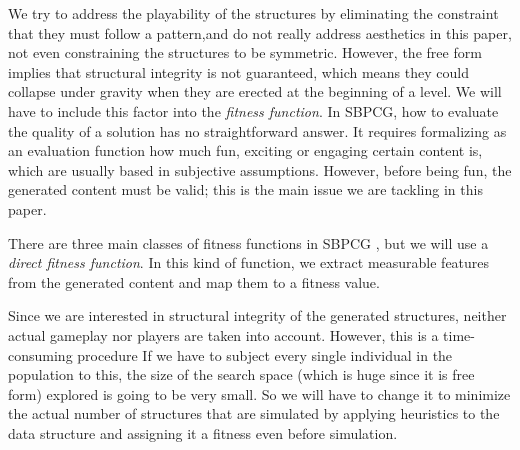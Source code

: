 \documentclass[runningheads,a4paper]{llncs}
\begin{document}
We try to address the playability of the structures by eliminating the constraint
that they must follow a pattern,and do not really address aesthetics
in this paper, not even constraining the structures to be
symmetric. However, the free form implies that structural integrity is
not guaranteed, which means they could collapse under gravity 
when they are erected at the
beginning of a level. We will have to include this factor into the 
\textit{fitness function}.
In SBPCG, how to evaluate the quality of a solution has no straightforward 
answer. It requires formalizing as an evaluation function how much fun, 
exciting or engaging certain content is, which are usually based in subjective 
assumptions. However, before being fun, the generated content must be
valid; this is the main issue we are tackling in this paper.

There are three main classes of fitness functions in 
SBPCG \cite{togelius2010search}, but we will use a {\em direct fitness function}.
In this kind of function, we extract measurable features from the generated content and map them to a fitness value.


Since we are interested in structural integrity of the generated
structures, neither actual gameplay nor players are taken into
account. However, this is a time-consuming procedure
If we have to subject every single individual in
the population to this, the size of the search space (which is huge
since it is free form) explored is going to be very small. So we will
have to change it to minimize the actual number of structures that are
simulated by applying heuristics to the data structure and assigning
it a fitness even before simulation.
\end{document}

